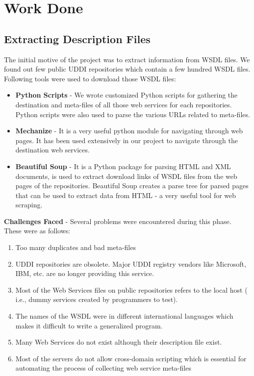 \documentclass[12pt, oneside]{book}
\begin{document}
\section{Work Done}
\subsection{Extracting Description Files}
The initial motive of the project was to extract information from WSDL files. We found out few public UDDI repositories which contain a few hundred WSDL files. Following tools were used to download those WSDL files:
\begin{itemize}
 \item \textbf{Python Scripts} - We wrote customized Python scripts for gathering the destination and meta-files of all those web services for each repositories. Python scripts were also used to parse the various URLs related to meta-files.
 \item \textbf{Mechanize} - It is a very useful python module for navigating through web pages. It has been used extensively in our project to navigate through the destination web services.
 \item \textbf{Beautiful Soup} - It is a Python package for parsing HTML and XML documents, is used to extract download links of WSDL files from the web pages of the repositories. Beautiful Soup creates a parse tree for parsed pages that can be used to extract data from HTML - a very useful tool for web scraping.
\end{itemize}
\textbf{Challenges Faced} - Several problems were encountered during this phase. These were as follows:
\begin{enumerate}
 \item Too many duplicates and bad meta-files
 \item UDDI repositories are obsolete. Major UDDI registry vendors like Microsoft, IBM, etc. are no longer providing this service.
 \item Most of the Web Services files on public repositories refers to the local host ( i.e., dummy services created by programmers to test).
 \item The names of the WSDL were in different international languages which makes it difficult to write a generalized program.
 \item Many Web Services do not exist although their description file exist.
 \item Most of the servers do not allow cross-domain scripting which is essential for automating the process of collecting web service meta-files
\end{enumerate}
\end{document}
